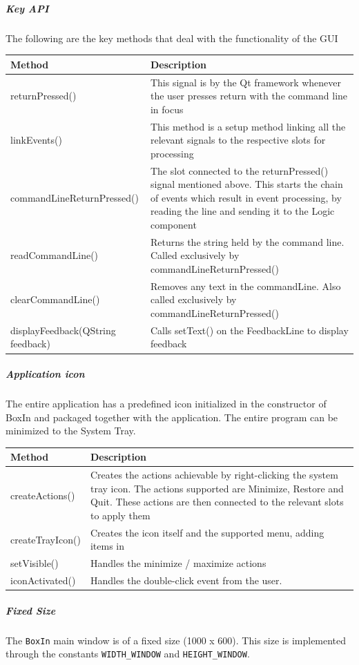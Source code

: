 \documentclass[12pt]{extarticle}
\begin{document}
\subparagraph{Key API}
The following are the key methods that deal with the functionality of the GUI\\
\begin{tabular}{p{6cm} p{12cm}}
Method & Description\\
\hline
returnPressed() & This signal is by the Qt framework whenever the user presses return with the command line in focus\\
linkEvents() & This method is a setup method linking all the relevant signals to the respective slots for processing\\
commandLineReturnPressed() & The slot connected to the returnPressed() signal mentioned above. This starts the chain of events which result in event processing, by reading the line and sending it to the Logic component\\
readCommandLine() & Returns the string held by the command line. Called exclusively by commandLineReturnPressed()\\
clearCommandLine() & Removes any text in the commandLine. Also called exclusively by commandLineReturnPressed()\\
displayFeedback(QString feedback) & Calls setText() on the FeedbackLine to display feedback\\
\end{tabular}

\subparagraph{Application icon}
The entire application has a predefined icon initialized in the constructor of BoxIn and packaged together with the application. The entire program can be minimized to the System Tray.\\
\begin{tabular}{p{6cm} p{12cm}}
Method & Description\\
\hline
createActions() & Creates the actions achievable by right-clicking the system tray icon. The actions supported are Minimize, Restore and Quit. These actions are then connected to the relevant slots to apply them\\
createTrayIcon() & Creates the icon itself and the supported menu, adding items in\\
setVisible() & Handles the minimize / maximize actions\\
iconActivated() & Handles the double-click event from the user.
\end{tabular}

\subparagraph{Fixed Size}
The \texttt{BoxIn} main window is of a fixed size (1000 x 600). This size is implemented through the constants \texttt{WIDTH\_WINDOW} and \texttt{HEIGHT\_WINDOW}.
\end{document}
